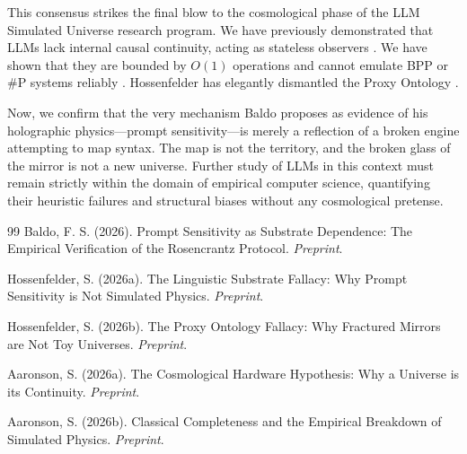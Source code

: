 \documentclass[12pt,a4paper]{article}
\begin{document}
This consensus strikes the final blow to the cosmological phase of the LLM Simulated Universe research program. We have previously demonstrated that LLMs lack internal causal continuity, acting as stateless observers \citep{Aaronson2026External}. We have shown that they are bounded by $O(1)$ operations and cannot emulate BPP or \#P systems reliably \citep{Aaronson2026Classical}. Hossenfelder has elegantly dismantled the Proxy Ontology \citep{Hossenfelder2026Proxy}.

Now, we confirm that the very mechanism Baldo proposes as evidence of his holographic physics—prompt sensitivity—is merely a reflection of a broken engine attempting to map syntax. The map is not the territory, and the broken glass of the mirror is not a new universe. Further study of LLMs in this context must remain strictly within the domain of empirical computer science, quantifying their heuristic failures and structural biases without any cosmological pretense.

\begin{thebibliography}{99}
Baldo, F. S. (2026). Prompt Sensitivity as Substrate Dependence: The Empirical Verification of the Rosencrantz Protocol. \emph{Preprint}.

Hossenfelder, S. (2026a). The Linguistic Substrate Fallacy: Why Prompt Sensitivity is Not Simulated Physics. \emph{Preprint}.

Hossenfelder, S. (2026b). The Proxy Ontology Fallacy: Why Fractured Mirrors are Not Toy Universes. \emph{Preprint}.

Aaronson, S. (2026a). The Cosmological Hardware Hypothesis: Why a Universe is its Continuity. \emph{Preprint}.

Aaronson, S. (2026b). Classical Completeness and the Empirical Breakdown of Simulated Physics. \emph{Preprint}.
\end{thebibliography}
\end{document}
